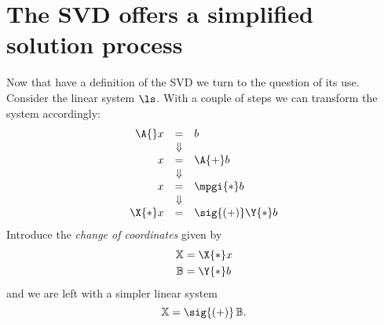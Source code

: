\section{The SVD offers a simplified solution process}
Now that have a definition of the SVD we turn to the question of its use. Consider the linear system $\ls$. With a couple of steps we can transform the system accordingly:
\begin{equation}
  \begin{array}{rcl}
  \A{}x &=& b \\
   &\Downarrow\\
   x &=& \A{+}b \\
   &\Downarrow\\
   x &=& \mpgi{*} b\\
   &\Downarrow\\
   \X{*} x &=& \sig{(+)}\Y{*} b
  \end{array}
\end{equation}
Introduce the \textit{change of coordinates} given by
\begin{equation}
  \begin{split}
    \mathbb{X} & = \X{*} x  \\
    \mathbb{B} & = \Y{*} b
  \end{split}
\end{equation}
and we are left with a simpler linear system
\begin{equation}
    \mathbb{X} = \sig{(+)}\, \mathbb{B}.
    \label{eq:formal:svdsoln}
\end{equation}

